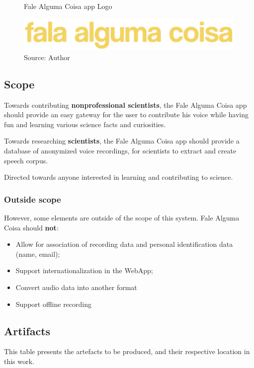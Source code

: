 \begin{figure}[ht]
    \centering
    \caption{Fale Alguma Coisa app Logo}
     \includegraphics[width=\linewidth/2]{images/app/logo.jpg}
    \caption*{Source: Author}
    \label{fig:falealgumacoisa-logo}
\end{figure}

\subsection{Scope}
\label{sec:app-scope}

Towards contributing \textbf{nonprofessional scientists}, the Fale Alguma Coisa app should provide an easy gateway for the user to contribute his voice while having fun and learning various science facts and curiosities.

Towards researching \textbf{scientists}, the Fale Alguma Coisa app should provide a database of anonymized voice recordings, for scientists to extract and create speech corpus.

Directed towards anyone interested in learning and contributing to science.

\subsubsection{Outside scope}

However, some elements are outside of the scope of this system. Fale Alguma Coisa should \textbf{not}:
\begin{itemize}
    \item Allow for association of recording data and personal identification data (name, email);
    \item Support internationalization in the WebApp;
    \item Convert audio data into another format
    \item Support offline recording
\end{itemize}

\subsection{Artifacts}
\label{sec:app-artefacts}

This table presents the artefacts to be produced, and their respective location in this work.

